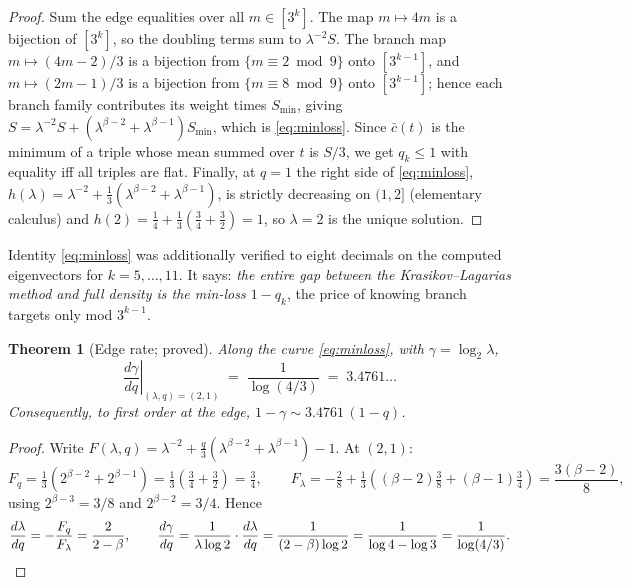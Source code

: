 \documentclass[11pt]{article}
\newtheorem{theorem}{Theorem}
\theoremstyle{definition}
\theoremstyle{remark}
\newcommand{\lam}{\lambda}
\newcommand{\gam}{\gamma}
\newcommand{\bet}{\beta}
\begin{document}
\begin{proof}
Sum the edge equalities over all $m \in [3^k]$. The map $m \mapsto 4m$ is a
bijection of $[3^k]$, so the doubling terms sum to $\lam^{-2} S$. The branch
map $m \mapsto (4m-2)/3$ is a bijection from $\{ m \equiv 2 \bmod 9 \}$ onto
$[3^{k-1}]$, and $m \mapsto (2m-1)/3$ is a bijection from
$\{ m \equiv 8 \bmod 9 \}$ onto $[3^{k-1}]$; hence each branch family
contributes its weight times $S_{\min}$, giving
$S = \lam^{-2} S + (\lam^{\bet-2} + \lam^{\bet-1}) S_{\min}$, which is
\eqref{eq:minloss}. Since $\bar c(t)$ is the minimum of a triple whose mean
summed over $t$ is $S/3$, we get $q_k \leq 1$ with equality iff all triples are
flat. Finally, at $q = 1$ the right side of \eqref{eq:minloss},
$h(\lam) = \lam^{-2} + \frac{1}{3}(\lam^{\bet-2} + \lam^{\bet-1})$, is strictly
decreasing on $(1, 2]$ (elementary calculus) and $h(2) = \frac14 + \frac13
(\frac34 + \frac32) = 1$, so $\lam = 2$ is the unique solution.
\end{proof}

Identity \eqref{eq:minloss} was additionally verified to eight decimals on the
computed eigenvectors for $k = 5, \ldots, 11$. It says: \emph{the entire gap
between the Krasikov--Lagarias method and full density is the min-loss
$1 - q_k$}, the price of knowing branch targets only mod $3^{k-1}$.

\begin{theorem}[Edge rate; proved]\label{thm:edgerate}
Along the curve \eqref{eq:minloss}, with $\gam = \log_2 \lam$,
\[
\left. \frac{d\gam}{dq} \right|_{(\lam, q) = (2, 1)}
\;=\; \frac{1}{\log(4/3)} \;=\; 3.4761\ldots
\]
Consequently, to first order at the edge,
$1 - \gam \sim 3.4761\,(1 - q)$.
\end{theorem}

\begin{proof}
Write $F(\lam, q) = \lam^{-2} + \frac{q}{3}(\lam^{\bet-2} + \lam^{\bet-1}) - 1$.
At $(2, 1)$:
\[
F_q = \tfrac{1}{3}\left( 2^{\bet-2} + 2^{\bet-1} \right)
    = \tfrac{1}{3}\left( \tfrac34 + \tfrac32 \right) = \tfrac34,
\qquad
F_\lam = -\tfrac{2}{8} + \tfrac{1}{3}\left( (\bet-2)\tfrac{3}{8} + (\bet-1)\tfrac{3}{4} \right)
       = \frac{3(\bet - 2)}{8},
\]
using $2^{\bet-3} = 3/8$ and $2^{\bet-2} = 3/4$. Hence
\[
\frac{d\lam}{dq} = -\frac{F_q}{F_\lam} = \frac{2}{2 - \bet},
\qquad
\frac{d\gam}{dq} = \frac{1}{\lam \log 2} \cdot \frac{d\lam}{dq}
= \frac{1}{(2 - \bet) \log 2}
= \frac{1}{\log 4 - \log 3} = \frac{1}{\log(4/3)} . \qedhere
\]
\end{proof}
\end{document}
